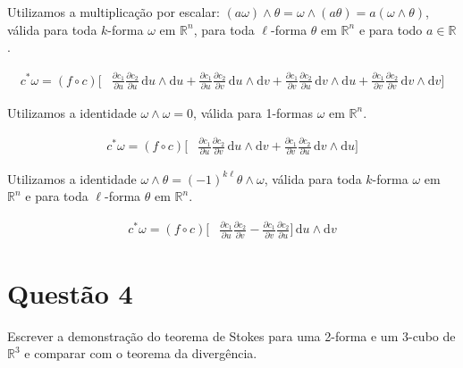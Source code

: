 \documentclass[12pt,a4paper]{article}
\begin{document}
		Utilizamos a multiplica\c{c}\~ao por escalar: $(a\omega) \wedge \theta = \omega \wedge (a \theta) = a (\omega \wedge \theta)$, v\'alida para toda $k$-forma $\omega$ em $\mathbb{R}^n$, para toda $\ell$-forma $\theta$ em $\mathbb{R}^n$ e para todo $a \in \mathbb{R}$.

		\begin{align}
			c^*\omega = (f \circ c) \biggl[ &\frac{\partial c_1}{\partial u} \frac{\partial c_2}{\partial u}\,\mathrm{d}u \wedge \mathrm{d}u
			+ \frac{\partial c_1}{\partial u} \frac{\partial c_2}{\partial v}\,\mathrm{d}u \wedge \mathrm{d}v
			+ \frac{\partial c_1}{\partial v} \frac{\partial c_2}{\partial u}\,\mathrm{d}v \wedge \mathrm{d}u
			+ \frac{\partial c_1}{\partial v} \frac{\partial c_2}{\partial v}\,\mathrm{d}v \wedge \mathrm{d}v \biggl]
		\end{align}

		Utilizamos a identidade $\omega \wedge \omega = 0$, v\'alida para 1-formas $\omega$ em $\mathbb{R}^n$.

		\begin{align}
			c^*\omega = (f \circ c) \biggl[ &\frac{\partial c_1}{\partial u} \frac{\partial c_2}{\partial v}\,\mathrm{d}u \wedge \mathrm{d}v
			+ \frac{\partial c_1}{\partial v} \frac{\partial c_2}{\partial u}\,\mathrm{d}v \wedge \mathrm{d}u \biggl]
		\end{align}

		Utilizamos a identidade $\omega \wedge \theta = (-1)^{k\ell} \theta \wedge \omega$, v\'alida para toda $k$-forma $\omega$ em $\mathbb{R}^n$ e para toda $\ell$-forma $\theta$ em $\mathbb{R}^n$.

		\begin{align}
			c^*\omega = (f \circ c) \biggl[ &\frac{\partial c_1}{\partial u} \frac{\partial c_2}{\partial v}
			- \frac{\partial c_1}{\partial v} \frac{\partial c_2}{\partial u} \biggl] \,\mathrm{d}u \wedge \mathrm{d}v
		\end{align}

	\section{Quest\~ao 4}
		\begin{flushright}
		\end{flushright}

		Escrever a demonstra\c{c}\~ao do teorema de Stokes para uma 2-forma e um 3-cubo de $\mathbb{R}^3$ e comparar com o teorema da diverg\^encia.

		\begin{flushright}
		\end{flushright}
\end{document}
